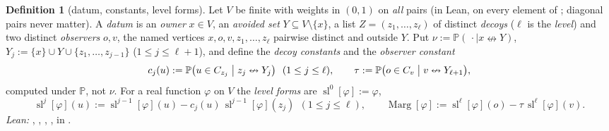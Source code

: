 \documentclass[11pt]{article}
\theoremstyle{definition}
\newtheorem{definition}[theorem]{Definition}
\theoremstyle{remark}
\newcommand{\PP}{\mathbb{P}}
\newcommand{\ncon}{\nleftrightarrow}
\newcommand{\Marg}{\operatorname{Marg}}
\newcommand{\slf}{\operatorname{sl}}
\begin{document}
\begin{definition}[datum, constants, level forms]\label{def:datum}
Let $V$ be finite with weights in $(0,1)$ on \emph{all} pairs (in Lean, on every element of ; diagonal pairs never matter).
A \emph{datum} is an \emph{owner} $x\in V$, an \emph{avoided set} $Y\subseteq V\setminus\{x\}$, a list $Z=(z_1,\dots,z_\ell)$ of distinct
\emph{decoys} ($\ell$ is the \emph{level}) and two distinct \emph{observers} $o,v$, the named vertices $x,o,v,z_1,\dots,z_\ell$ pairwise distinct
and outside $Y$.  Put $\nu:=\PP(\,\cdot\mid x\ncon Y)$, $Y_j:=\{x\}\cup Y\cup\{z_1,\dots,z_{j-1}\}$ ($1\le j\le \ell+1$), and define the
\emph{decoy constants} and the \emph{observer constant}
\begin{equation}\label{eq:constants}
 c_j(u):=\PP\bigl(u\in C_{z_j}\bigm|z_j\ncon Y_j\bigr)\ \ (1\le j\le \ell),\qquad \tau:=\PP\bigl(o\in C_v\bigm|v\ncon Y_{\ell+1}\bigr),
\end{equation}
computed under $\PP$, not $\nu$.  For a real function $\varphi$ on $V$ the \emph{level forms} are $\slf^0[\varphi]:=\varphi$,
\begin{equation}\label{eq:sl}
 \slf^j[\varphi](u):=\slf^{j-1}[\varphi](u)-c_j(u)\,\slf^{j-1}[\varphi](z_j)\ \ (1\le j\le \ell),\qquad
 \Marg[\varphi]:=\slf^\ell[\varphi](o)-\tau\,\slf^\ell[\varphi](v).
\end{equation}
\emph{Lean:} , , , ,  in .
\end{definition}
\end{document}
